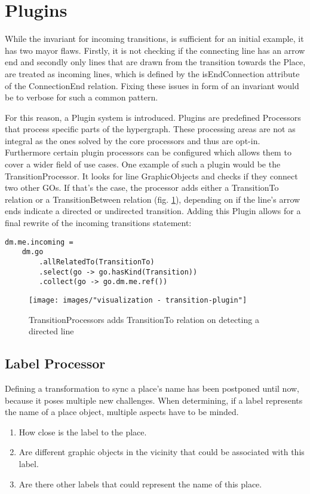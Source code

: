 \section{Plugins}
\label{sec:plugins}

While the invariant for incoming transitions, is sufficient for an initial example, it has two mayor flaws. Firstly, it is not checking if the connecting line has an arrow end and secondly only lines that are drawn from the transition towards the Place, are treated as incoming lines, which is defined by the isEndConnection attribute of the ConnectionEnd relation. Fixing these issues in form of an invariant would be to verbose for such a common pattern.

For this reason, a Plugin system is introduced. Plugins are predefined Processors that process specific parts of the hypergraph. These processing areas are not as integral as the ones solved by the core processors and thus are opt-in. Furthermore certain plugin processors can be configured which allows them to cover a wider field of use cases. One example of such a plugin would be the TransitionProcessor. It looks for line GraphicObjects and checks if they connect two other GOs. If that's the case, the processor adds either a TransitionTo relation or a TransitionBetween relation (fig. \ref{fig:transition-plugin}), depending on if the line's arrow ends indicate a directed or undirected transition. Adding this Plugin allows for a final rewrite of the incoming transitions statement:

\begin{lstlisting}[language=OCL]
dm.me.incoming = 
    dm.go
        .allRelatedTo(TransitionTo)
        .select(go -> go.hasKind(Transition))
        .collect(go -> go.dm.me.ref())
\end{lstlisting}

\begin{figure}[ht]
\centering
\texttt{[image: images/"visualization - transition-plugin"]}
\caption{TransitionProcessors adds TransitionTo relation on detecting a directed line}
\label{fig:transition-plugin}
\end{figure}



\subsection{Label Processor}

Defining a transformation to sync a place's name has been postponed until now, because it poses multiple new challenges. When determining, if a label represents the name of a place object, multiple aspects have to be minded. 
\begin{enumerate}
  \item How close is the label to the place.
  \item Are different graphic objects in the vicinity that could be associated with this label.
  \item Are there other labels that could represent the name of this place.
\end{enumerate}

